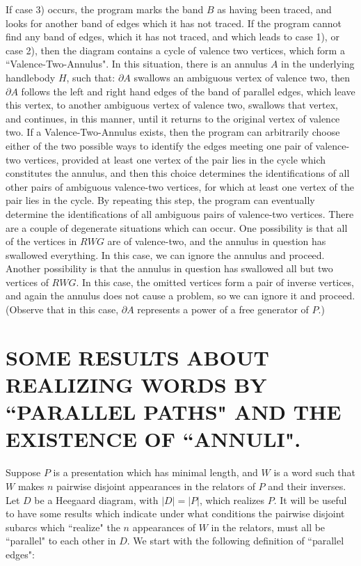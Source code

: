\documentclass[12pt]{amsart}
\begin{document}
                If case 3) occurs, the program marks the band $B$ as having been traced, and looks for
        another band of edges which it has not traced. If the program cannot find any band of
        edges, which it has not traced, and which leads to case 1), or case 2), then the diagram
        contains a cycle of valence two vertices, which form a  ``Valence-Two-Annulus". In this
        situation, there is an annulus $A$ in the underlying handlebody $H$, such that: $\partial A$ swallows
        an ambiguous vertex of valence two, then $\partial A$ follows the left and right hand edges of the
        band of parallel edges, which leave this vertex, to another ambiguous vertex of valence
        two, swallows that vertex, and continues, in this manner, until it returns to the original
        vertex of valence two.
                If a Valence-Two-Annulus exists, then the program can arbitrarily choose either of
        the two possible ways to identify the edges meeting one pair of valence-two vertices,
        provided at least one vertex of the pair lies in the cycle which constitutes the annulus,
        and then this choice determines the identifications of all other pairs of ambiguous
        valence-two vertices, for which at least one vertex of the pair lies in the cycle. By
        repeating this step, the program can eventually determine the identifications of all
        ambiguous pairs of valence-two vertices.
                There are a couple of degenerate situations which can occur. One possibility is that
        all of the vertices in $RWG$ are of valence-two, and the annulus in question has swallowed
        everything. In this case, we can ignore the annulus and proceed. Another possibility is
        that the annulus in question has swallowed all but two vertices of $RWG$. In this case, the
        omitted vertices form a pair of inverse vertices, and again the annulus does not cause
        a problem, so we can ignore it and proceed. (Observe that in this case, $\partial A$ represents a
        power of a free generator of $P$.)
        

\section{SOME RESULTS ABOUT REALIZING WORDS BY  ``PARALLEL PATHS" AND THE EXISTENCE OF  ``ANNULI".}


                Suppose $P$ is a presentation which has minimal length, and $W$ is a word such that $W$
        makes $n$ pairwise disjoint appearances in the relators of $P$ and their inverses. Let $D$ be
        a Heegaard diagram, with $|D| = |P|$, which realizes $P$. It will be useful to have some
        results which indicate under what conditions the pairwise disjoint subarcs which
         ``realize" the $n$ appearances of $W$ in the relators, must all be  ``parallel" to each other
        in $D$. We start with the following definition of  ``parallel edges":
        
\end{document}
